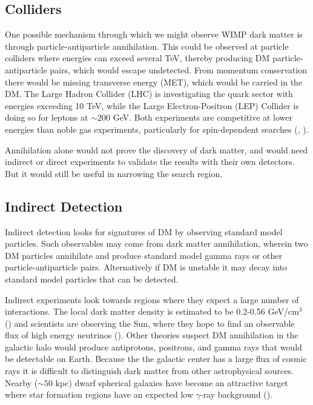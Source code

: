 \subsection{Colliders} \label{subsec:colliders}
One possible mechanism through which we might observe WIMP dark matter is through particle-antiparticle
annihilation.  This could be observed at particle colliders where energies can exceed
several TeV, thereby producing DM particle-antiparticle pairs, which
would escape undetected.  From momentum conservation there would be missing transverse energy (MET),
which would be carried in the DM.  The Large Hadron Collider (LHC) is investigating the quark sector with energies
exceeding 10 TeV, while the Large Electron-Positron (LEP) Collider is doing so for leptons at
$\sim 200$ GeV.  Both experiments are competitive at lower energies than noble gas experiments, particularly
for spin-dependent searches (, ).

Annihilation alone would not prove the discovery of dark matter, and would need
indirect or direct experiments to validate the results with their own detectors.  But
it would still be useful in narrowing the search region.


\subsection{Indirect Detection} \label{subsec:indirect}
Indirect detection looks for signatures of DM by observing standard model particles.  Such observables
may come from dark matter annihilation, wherein two DM particles annihilate and produce standard model
gamma rays or other particle-antiparticle pairs.  Alternatively if DM is unstable it may decay into
standard model particles that can be detected.

Indirect experiments look towards regions where they expect a large number of interactions.  The local
dark matter density is estimated to be 0.2-0.56 GeV/cm$^{3}$ () and scientists are observing
the Sun, where they hope to find an observable flux of high energy neutrinos ().  Other theories suspect
DM annihilation in the galactic halo would produce
antiprotons, positrons, and gamma rays that would be detectable on Earth.  Because the the galactic center
has a large flux of cosmic rays it is difficult to distinguish dark matter from other astrophysical
sources.  Nearby ($\sim 50$ kpc) dwarf spherical
galaxies have become an attractive target where star formation regions have an expected low $\gamma$-ray
background ().


